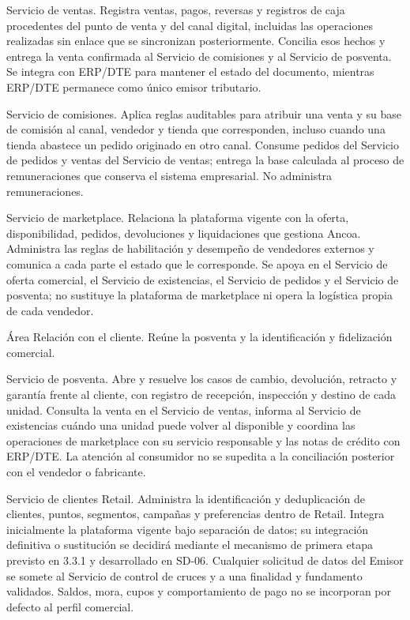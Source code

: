 \documentclass[11pt]{article}
\begin{document}
{Servicio de ventas. Registra ventas, pagos, reversas y registros de caja procedentes del punto de venta y del canal digital, incluidas las operaciones realizadas sin enlace que se sincronizan posteriormente. Concilia esos hechos y entrega la venta confirmada al Servicio de comisiones y al Servicio de posventa. Se integra con ERP/DTE para mantener el estado del documento, mientras ERP/DTE permanece como único emisor tributario.}

{Servicio de comisiones. Aplica reglas auditables para atribuir una venta y su base de comisión al canal, vendedor y tienda que corresponden, incluso cuando una tienda abastece un pedido originado en otro canal. Consume pedidos del Servicio de pedidos y ventas del Servicio de ventas; entrega la base calculada al proceso de remuneraciones que conserva el sistema empresarial. No administra remuneraciones.}

{Servicio de marketplace. Relaciona la plataforma vigente con la oferta, disponibilidad, pedidos, devoluciones y liquidaciones que gestiona Ancoa. Administra las reglas de habilitación y desempeño de vendedores externos y comunica a cada parte el estado que le corresponde. Se apoya en el Servicio de oferta comercial, el Servicio de existencias, el Servicio de pedidos y el Servicio de posventa; no sustituye la plataforma de marketplace ni opera la logística propia de cada vendedor.}

{Área Relación con el cliente. Reúne la posventa y la identificación y fidelización comercial.}

{Servicio de posventa. Abre y resuelve los casos de cambio, devolución, retracto y garantía frente al cliente, con registro de recepción, inspección y destino de cada unidad. Consulta la venta en el Servicio de ventas, informa al Servicio de existencias cuándo una unidad puede volver al disponible y coordina las operaciones de marketplace con su servicio responsable y las notas de crédito con ERP/DTE. La atención al consumidor no se supedita a la conciliación posterior con el vendedor o fabricante.}

{Servicio de clientes Retail. Administra la identificación y deduplicación de clientes, puntos, segmentos, campañas y preferencias dentro de Retail. Integra inicialmente la plataforma vigente bajo separación de datos; su integración definitiva o sustitución se decidirá mediante el mecanismo de primera etapa previsto en 3.3.1 y desarrollado en SD-06. Cualquier solicitud de datos del Emisor se somete al Servicio de control de cruces y a una finalidad y fundamento validados. Saldos, mora, cupos y comportamiento de pago no se incorporan por defecto al perfil comercial.}
\end{document}
